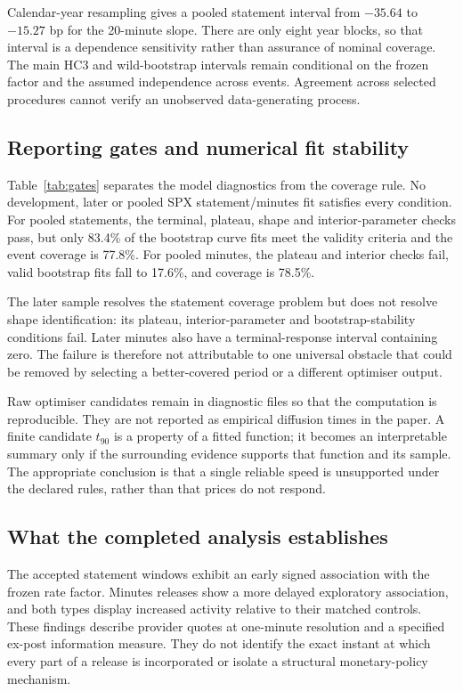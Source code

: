 
Calendar-year resampling gives a pooled statement interval from $-35.64$ to $-15.27$ bp for the 20-minute slope. There are only eight year blocks, so that interval is a dependence sensitivity rather than assurance of nominal coverage. The main HC3 and wild-bootstrap intervals remain conditional on the frozen factor and the assumed independence across events. Agreement across selected procedures cannot verify an unobserved data-generating process.

\subsection{Reporting gates and numerical fit stability}
Table~\ref{tab:gates} separates the model diagnostics from the coverage rule. No development, later or pooled SPX statement/minutes fit satisfies every condition. For pooled statements, the terminal, plateau, shape and interior-parameter checks pass, but only 83.4\% of the bootstrap curve fits meet the validity criteria and the event coverage is 77.8\%. For pooled minutes, the plateau and interior checks fail, valid bootstrap fits fall to 17.6\%, and coverage is 78.5\%.


The later sample resolves the statement coverage problem but does not resolve shape identification: its plateau, interior-parameter and bootstrap-stability conditions fail. Later minutes also have a terminal-response interval containing zero. The failure is therefore not attributable to one universal obstacle that could be removed by selecting a better-covered period or a different optimiser output.

Raw optimiser candidates remain in diagnostic files so that the computation is reproducible. They are not reported as empirical diffusion times in the paper. A finite candidate $t_{90}$ is a property of a fitted function; it becomes an interpretable summary only if the surrounding evidence supports that function and its sample. The appropriate conclusion is that a single reliable speed is unsupported under the declared rules, rather than that prices do not respond.

\subsection{What the completed analysis establishes}
The accepted statement windows exhibit an early signed association with the frozen rate factor. Minutes releases show a more delayed exploratory association, and both types display increased activity relative to their matched controls. These findings describe provider quotes at one-minute resolution and a specified ex-post information measure. They do not identify the exact instant at which every part of a release is incorporated or isolate a structural monetary-policy mechanism.

